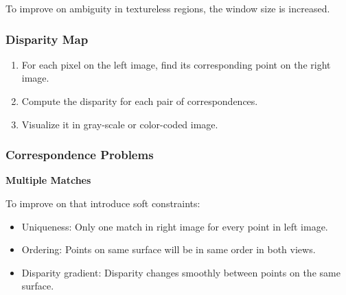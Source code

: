 \documentclass[10pt,a4paper]{scrartcl}
\begin{document}
\begin{multicols*}{2}
To improve on ambiguity in textureless regions, the window size is increased.



\subsubsection{Disparity Map}

\begin{enumerate}
\item For each pixel on the left image, find its corresponding point on the right image.
\item Compute the disparity for each pair of correspondences.
\item Visualize it in gray-scale or color-coded image.
\end{enumerate}

\subsubsection{Correspondence Problems}

\textbf{Multiple Matches}


To improve on that introduce soft constraints:

\begin{itemize}
\item Uniqueness: Only one match in right image for every point in left image.
\item Ordering: Points on same surface will be in same order in both views.
\item Disparity gradient: Disparity changes smoothly between points on the same surface.
\end{itemize}


\end{multicols*}
\end{document}
